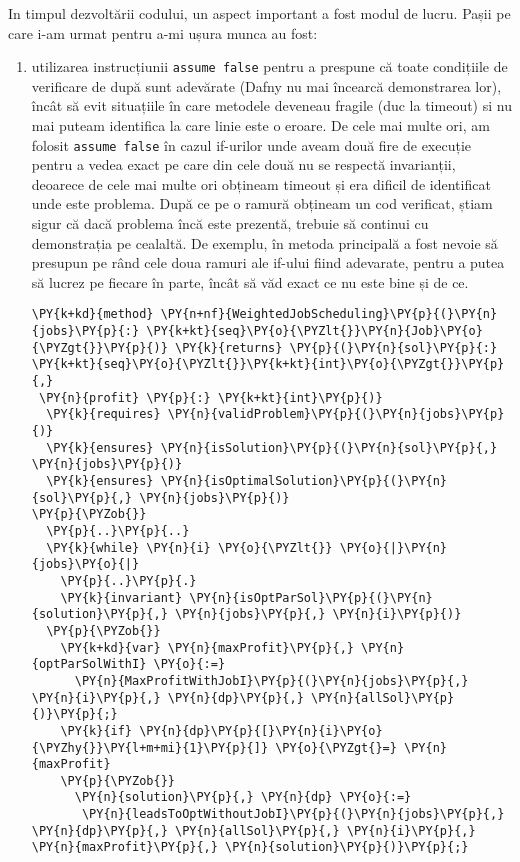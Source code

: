 In timpul dezvoltării codului, un aspect important a fost modul de lucru. Pașii pe care i-am urmat pentru a-mi ușura munca au fost:
\begin{enumerate}
    \item utilizarea instrucțiunii \texttt{assume false} pentru a prespune că toate condițiile de verificare de după sunt adevărate (Dafny nu mai încearcă demonstrarea lor), încât să evit situațiile în care metodele deveneau fragile (duc la timeout) si nu mai puteam identifica la care linie este o eroare. 
    De cele mai multe ori, am folosit \texttt{assume false} în cazul if-urilor unde aveam două fire de execuție pentru a vedea exact pe care din cele două nu se respectă invarianții, deoarece de cele mai multe ori obțineam timeout și era dificil de identificat unde este problema. După ce pe o ramură obțineam un cod verificat, știam sigur că dacă problema încă este prezentă, trebuie să continui cu demonstrația pe cealaltă.
    De exemplu, în metoda principală a fost nevoie să presupun pe rând cele doua ramuri ale if-ului fiind adevarate, pentru a putea să lucrez pe fiecare în parte, încât să văd exact ce nu este bine și de ce.
    \begin{Verbatim}[commandchars=\\\{\}, fontsize=\footnotesize]
\PY{k+kd}{method} \PY{n+nf}{WeightedJobScheduling}\PY{p}{(}\PY{n}{jobs}\PY{p}{:} \PY{k+kt}{seq}\PY{o}{\PYZlt{}}\PY{n}{Job}\PY{o}{\PYZgt{}}\PY{p}{)} \PY{k}{returns} \PY{p}{(}\PY{n}{sol}\PY{p}{:} \PY{k+kt}{seq}\PY{o}{\PYZlt{}}\PY{k+kt}{int}\PY{o}{\PYZgt{}}\PY{p}{,}
 \PY{n}{profit} \PY{p}{:} \PY{k+kt}{int}\PY{p}{)}
  \PY{k}{requires} \PY{n}{validProblem}\PY{p}{(}\PY{n}{jobs}\PY{p}{)}
  \PY{k}{ensures} \PY{n}{isSolution}\PY{p}{(}\PY{n}{sol}\PY{p}{,} \PY{n}{jobs}\PY{p}{)}
  \PY{k}{ensures} \PY{n}{isOptimalSolution}\PY{p}{(}\PY{n}{sol}\PY{p}{,} \PY{n}{jobs}\PY{p}{)}
\PY{p}{\PYZob{}}
  \PY{p}{..}\PY{p}{..}
  \PY{k}{while} \PY{n}{i} \PY{o}{\PYZlt{}} \PY{o}{|}\PY{n}{jobs}\PY{o}{|}
    \PY{p}{..}\PY{p}{.}
    \PY{k}{invariant} \PY{n}{isOptParSol}\PY{p}{(}\PY{n}{solution}\PY{p}{,} \PY{n}{jobs}\PY{p}{,} \PY{n}{i}\PY{p}{)}
  \PY{p}{\PYZob{}}
    \PY{k+kd}{var} \PY{n}{maxProfit}\PY{p}{,} \PY{n}{optParSolWithI} \PY{o}{:=}
      \PY{n}{MaxProfitWithJobI}\PY{p}{(}\PY{n}{jobs}\PY{p}{,} \PY{n}{i}\PY{p}{,} \PY{n}{dp}\PY{p}{,} \PY{n}{allSol}\PY{p}{)}\PY{p}{;}
    \PY{k}{if} \PY{n}{dp}\PY{p}{[}\PY{n}{i}\PY{o}{\PYZhy{}}\PY{l+m+mi}{1}\PY{p}{]} \PY{o}{\PYZgt{}=} \PY{n}{maxProfit} 
    \PY{p}{\PYZob{}}
      \PY{n}{solution}\PY{p}{,} \PY{n}{dp} \PY{o}{:=}
       \PY{n}{leadsToOptWithoutJobI}\PY{p}{(}\PY{n}{jobs}\PY{p}{,} \PY{n}{dp}\PY{p}{,} \PY{n}{allSol}\PY{p}{,} \PY{n}{i}\PY{p}{,} \PY{n}{maxProfit}\PY{p}{,} \PY{n}{solution}\PY{p}{)}\PY{p}{;}

\end{Verbatim}
\end{enumerate}

